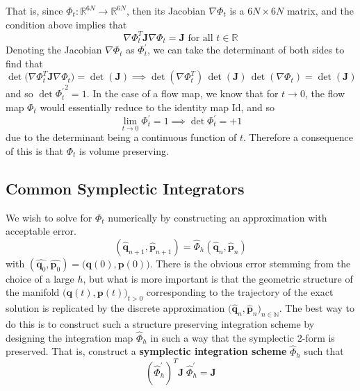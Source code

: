 \documentclass{article}
\theoremstyle{remark}
\theoremstyle{definition}
\begin{document}
That is, since $\Phi_t: \mathbb{R}^{6N} \longrightarrow \mathbb{R}^{6N}$, then its Jacobian $\nabla \Phi_t$ is a $6N \times 6N$ matrix, and the condition above implies that 
\[\nabla \Phi_t^T \mathbf{J} \nabla \Phi_t = \mathbf{J} \text{ for all } t \in \mathbb{R}\]
Denoting the Jacobian $\nabla \Phi_t$ as $\Phi_t^\prime$, we can take the determinant of both sides to find that 
\[\det\big(\nabla \Phi_t^T \mathbf{J} \nabla \Phi_t\big) = \det(\mathbf{J}) \implies \det(\nabla \Phi_t^T) \, \det(\mathbf{J})\, \det(\nabla \Phi_t) = \det(\mathbf{J})\]
and so $\det{\Phi_t^\prime}^2 = 1$. In the case of a flow map, we know that for $t \rightarrow 0$, the flow map $\Phi_{t}$ would essentially reduce to the identity map $\mathrm{Id}$, and so
\[\lim_{t \rightarrow 0} \Phi_t^\prime = 1 \implies \det{\Phi_t^\prime} = + 1\]
due to the determinant being a continuous function of $t$. Therefore a consequence of this is that $\Phi_t$ is volume preserving. 

\subsection{Common Symplectic Integrators}
We wish to solve for $\Phi_t$ numerically by constructing an approximation with acceptable error. 
\[(\hat{\mathbf{q}}_{n+1}, \hat{\mathbf{p}}_{n+1}) = \hat{\Phi}_{h} (\hat{\mathbf{q}}_{n}, \hat{\mathbf{p}}_{n})\]
with $(\hat{\mathbf{q}_0}, \hat{\mathbf{p}_0}) = \big( \mathbf{q}(0), \mathbf{p}(0)\big)$. There is the obvious error stemming from the choice of a large $h$, but what is more important is that the geometric structure of the manifold $\big( \mathbf{q}(t), \mathbf{p}(t)\big)_{t > 0}$ corresponding to the trajectory of the exact solution is replicated by the discrete approximation $\big(\hat{\mathbf{q}}_n, \hat{\mathbf{p}}_n\big)_{n \in \mathbb{N}}$. The best way to do this is to construct such a structure preserving integration scheme by designing the integration map $\hat{\Phi}_{h}$ in such a way that the symplectic 2-form is preserved. That is, construct a \textbf{symplectic integration scheme} $\hat{\Phi}_{h}$ such that 
\[(\hat{\Phi}_{h}^\prime)^T \mathbf{J} \; \hat{\Phi}_{h}^\prime = \mathbf{J}\]
\end{document}

